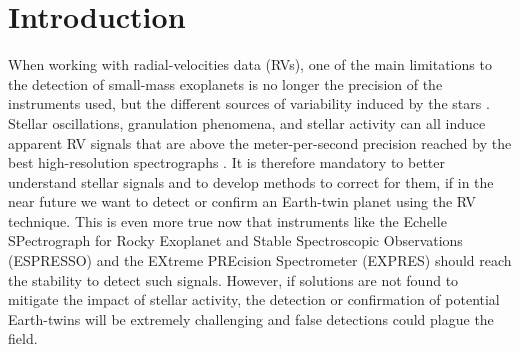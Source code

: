 \documentclass{aa}
\begin{document}
\maketitle

\section{Introduction} \label{intro}


When working with radial-velocities data (RVs), one of the main limitations to the detection of small-mass exoplanets is no longer the precision of the instruments used, but the different sources of variability induced by the stars \citep[e.g.][]{Feng:2017aa, Dumusque:2017aa, Rajpaul-2015, Robertson-2014}. 
Stellar oscillations, granulation phenomena, and stellar activity can all induce apparent RV signals that are above the meter-per-second precision \citep[e.g.][]{Saar-1997b, Queloz-2001, Desort-2007, Dumusque-2011a, Dumusque-2016a} reached by the best high-resolution spectrographs \citep[HARPS, HARPS-N,][]{Mayor-2003,Cosentino-2012}.
%
It is therefore mandatory to better understand stellar signals and to develop methods to correct for them, if in the near future we want to detect or confirm an Earth-twin planet using the RV technique. This is even more true now that instruments like the Echelle SPectrograph for Rocky Exoplanet and Stable Spectroscopic Observations (ESPRESSO) \citep{Pepe-2014} and the EXtreme PREcision Spectrometer (EXPRES) \citep{fischer2016state} should reach the stability to detect such signals. However, if solutions are not found to mitigate the impact of stellar activity, the detection or confirmation of potential Earth-twins will be extremely challenging and false detections could plague the field.

\end{document}
